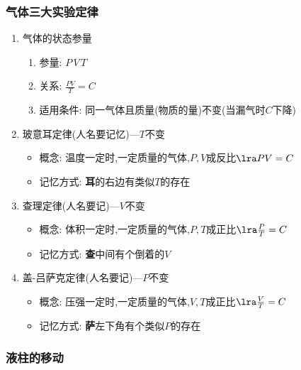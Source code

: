 \documentclass{article}
\begin{document}
\vspace{2em}

\subsubsection{气体三大实验定律}
\begin{enumerate}[label = \arabic*]
    \item 气体的状态参量
          \begin{enumerate}[label = (\arabic*)]
              \item 参量: $P \, V \, T$
              \item 关系: $\frac{PV}{T} = C$
              \item 适用条件: 同一气体且质量(物质的量)不变(当漏气时$C$下降)
          \end{enumerate}
    \item 玻意耳定律(人名要记忆)---$T$不变
          \begin{itemize}
              \item 概念: 温度一定时,一定质量的气体,$P,V$成反比$\lra PV = C$
              \item 记忆方式: \textbf{耳}的右边有类似$T$的存在
          \end{itemize}
    \item 查理定律(人名要记)---$V$不变
          \begin{itemize}
              \item 概念: 体积一定时,一定质量的气体,$P,T$成正比$\lra \frac{P}{T} = C$
              \item 记忆方式: \textbf{查}中间有个倒着的$V$
          \end{itemize}
    \item 盖-吕萨克定律(人名要记)---$P$不变
          \begin{itemize}
              \item 概念: 压强一定时,一定质量的气体,$V,T$成正比$\lra \frac{V}{T} = C$
              \item 记忆方式: \textbf{萨}左下角有个类似$P$的存在
          \end{itemize}
\end{enumerate}

\vspace{2em}

\subsubsection{液柱的移动}
\end{document}
